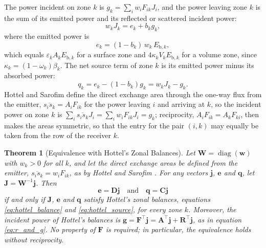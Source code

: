 \documentclass[preprint,1p,times]{elsarticle}
\theoremstyle{plain}
\newtheorem{theorem}{Theorem}[section]
\theoremstyle{definition}
\theoremstyle{remark}
\begin{document}
The power incident on zone $k$ is $g_k = \sum_i w_i F_{ik} J_i$, and the power leaving zone $k$ is the sum of its emitted power and its reflected or scattered incident power:
\begin{equation}
w_k J_k = e_k + b_k g_k ,
\label{eq:hottel_balance}
\end{equation}
where the emitted power is
\begin{equation}
e_k = (1 - b_k)\, w_k\, E_{\mathrm{b},k} ,
\label{eq:hottel_emission}
\end{equation}
which equals $\varepsilon_k A_k E_{\mathrm{b},k}$ for a surface zone and $4 \kappa_k V_k E_{\mathrm{b},k}$ for a volume zone, since $\kappa_k = (1-\omega_k)\beta_k$. The net source term of zone $k$ is its emitted power minus its absorbed power:
\begin{equation}
q_k = e_k - (1 - b_k) g_k = w_k J_k - g_k .
\label{eq:hottel_source}
\end{equation}
Hottel and Sarofim \citep{Hottel1967} define the direct exchange area through the one-way flux from the emitter, $\overline{s_i s_k} = A_i F_{ik}$ for the power leaving $i$ and arriving at $k$, so the incident power on zone $k$ is $\sum_i \overline{s_i s_k} J_i = \sum_i w_i F_{ik} J_i = g_k$; reciprocity, $A_i F_{ik} = A_k F_{ki}$, then makes the areas symmetric, so that the entry for the pair $(i,k)$ may equally be taken from the row of the receiver $k$.

\begin{theorem}[Equivalence with Hottel's Zonal Balances]
\label{thm:hottel_equivalence}
Let $\mathbf{W} = \operatorname{diag}(\mathbf{w})$ with $w_k > 0$ for all $k$, and let the direct exchange areas be defined from the emitter, $\overline{s_i s_k} = w_i F_{ik}$, as by Hottel and Sarofim \citep{Hottel1967}. For any vectors $\mathbf{j}$, $\mathbf{e}$ and $\mathbf{q}$, let $\mathbf{J} = \mathbf{W}^{-1}\mathbf{j}$. Then
\begin{equation}
\mathbf{e} = \mathbf{D}\mathbf{j}
\quad \text{and} \quad
\mathbf{q} = \mathbf{C}\mathbf{j}
\end{equation}
if and only if $\mathbf{J}$, $\mathbf{e}$ and $\mathbf{q}$ satisfy Hottel's zonal balances, equations \eqref{eq:hottel_balance} and \eqref{eq:hottel_source}, for every zone $k$. Moreover, the incident power of Hottel's balances is $\mathbf{g} = \mathbf{F}^\top\mathbf{j} = \mathbf{A}^\top\mathbf{j} + \mathbf{R}^\top\mathbf{j}$, as in equation \eqref{eq:r_and_g}. No property of $\mathbf{F}$ is required; in particular, the equivalence holds without reciprocity.
\end{theorem}
\end{document}

